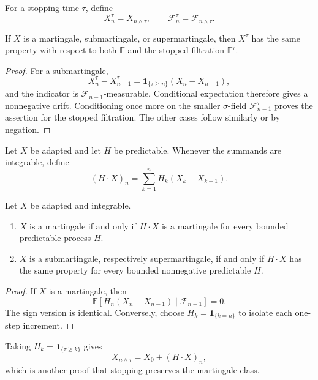 \begin{de}
For a stopping time $\tau$, define
\[
X_n^\tau=X_{n\wedge\tau},
\qquad
\mathcal F_n^\tau=\mathcal F_{n\wedge\tau}.
\]
\end{de}

\begin{thm}
If $X$ is a martingale, submartingale, or supermartingale, then $X^\tau$ has
the same property with respect to both $\mathbb F$ and the stopped filtration
$\mathbb F^\tau$.
\end{thm}

\begin{proof}
For a submartingale,
\[
X_n^\tau-X_{n-1}^\tau
 =\mathbf1_{\{\tau\geq n\}}(X_n-X_{n-1}),
\]
and the indicator is $\mathcal F_{n-1}$-measurable. Conditional expectation
therefore gives a nonnegative drift. Conditioning once more on the smaller
$\sigma$-field $\mathcal F_{n-1}^\tau$ proves the assertion for the stopped
filtration. The other cases follow similarly or by negation.
\end{proof}

\begin{de}
Let $X$ be adapted and let $H$ be predictable. Whenever the summands are
integrable, define
\[
(H\mathbin{\cdot}X)_n
 =\sum_{k=1}^{n}H_k(X_k-X_{k-1}).
\]
\end{de}

\begin{thm}
Let $X$ be adapted and integrable.
\begin{enumerate}[label=(\roman*)]
  \item $X$ is a martingale if and only if $H\mathbin{\cdot}X$ is a
  martingale for every bounded predictable process $H$.
  \item $X$ is a submartingale, respectively supermartingale, if and only if
  $H\mathbin{\cdot}X$ has the same property for every bounded nonnegative
  predictable $H$.
\end{enumerate}
\end{thm}

\begin{proof}
If $X$ is a martingale, then
\[
\mathbb E[H_n(X_n-X_{n-1})\mid\mathcal F_{n-1}]=0.
\]
The sign version is identical. Conversely, choose
$H_k=\mathbf1_{\{k=n\}}$ to isolate each one-step increment.
\end{proof}

\begin{remark}
Taking $H_k=\mathbf1_{\{\tau\geq k\}}$ gives
\[
X_{n\wedge\tau}=X_0+(H\mathbin{\cdot}X)_n,
\]
which is another proof that stopping preserves the martingale class.
\end{remark}

